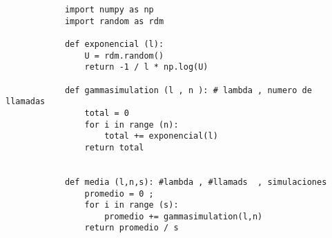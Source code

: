 \documentclass{article}
\begin{document}
\begin{flushleft}
        \begin{verbatim}
            import numpy as np 
            import random as rdm

            def exponencial (l):
                U = rdm.random()   
                return -1 / l * np.log(U) 

            def gammasimulation (l , n ): # lambda , numero de llamadas
                total = 0 
                for i in range (n):
                    total += exponencial(l)
                return total     


            def media (l,n,s): #lambda , #llamads  , simulaciones 
                promedio = 0 ;
                for i in range (s):
                    promedio += gammasimulation(l,n)
                return promedio / s     
        \end{verbatim}
    \end{flushleft}
   
   
\end{document}
